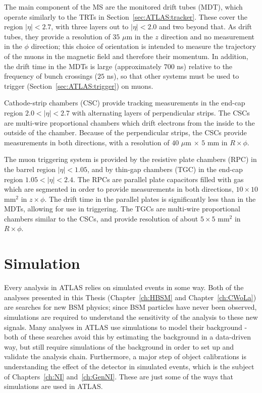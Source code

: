 The main component of the MS are the monitored drift tubes (MDT), which operate similarly to the TRTs in Section~\ref{sec:ATLAS:tracker}.
These cover the region $|\eta|<2.7$, with three layers out to $|\eta|<2.0$ and two beyond that.
As drift tubes, they provide a resolution of $35$ $\mu\text{m}$ in the $z$ direction and no measurement in the $\phi$ direction; this choice of orientation is intended to measure the trajectory of the muons in the magnetic field and therefore their momentum.
In addition, the drift time in the MDTs is large (approximately $700$ ns) relative to the frequency of bunch crossings ($25$ ns), so that other systems must be used to trigger (Section~\ref{sec:ATLAS:trigger}) on muons.

Cathode-strip chambers (CSC) provide tracking measurements in the end-cap region $2.0<|\eta|<2.7$ with alternating layers of perpendicular strips.
The CSCs are multi-wire proportional chambers which drift electrons from the inside to the outside of the chamber.
Because of the perpendicular strips, the CSCs provide measurements in both directions, with a resolution of $40$ $\mu\text{m}$ $\times$ $5$ $\text{mm}$ in $R \times \phi$.

The muon triggering system is provided by the resistive plate chambers (RPC) in the barrel region $|\eta|<1.05$, and by thin-gap chambers (TGC) in the end-cap region $1.05<|\eta|<2.4$.
The RPCs are parallel plate capacitors filled with gas which are segmented in order to provide measurements in both directions, $10\times 10$ $\text{mm}^2$ in $z \times \phi$.
The drift time in the parallel plates is significantly less than in the MDTs, allowing for use in triggering.
The TGCs are multi-wire proportional chambers similar to the CSCs, and provide resolution of about $5\times 5$ $\text{mm}^2$ in $R \times \phi$.

\section{Simulation}
\label{sec:ATLAS:simulation}
Every analysis in ATLAS relies on simulated events in some way.
Both of the analyses presented in this Thesis (Chapter~\ref{ch:HBSM} and Chapter~\ref{ch:CWoLa}) are searches for new BSM physics; since BSM particles have never been observed, simulations are required to understand the sensitivity of the analysis to these new signals.
Many analyses in ATLAS use simulations to model their background - both of these searches avoid this by estimating the background in a data-driven way, but still require simulations of the background in order to set up and validate the analysis chain.
Furthermore, a major step of object calibrations is understanding the effect of the detector in simulated events, which is the subject of Chapters~\ref{ch:NI} and~\ref{ch:GenNI}.
These are just some of the ways that simulations are used in ATLAS.

